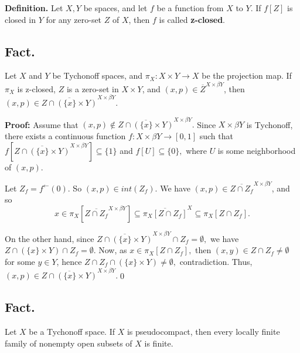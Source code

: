 \documentclass{article}
\begin{document}
		  \textbf{Definition.} Let $X,Y$ be spaces, and let $f$ be a function from $X$ to $Y$. If $f[Z]$ is closed in $Y$ for any zero-set $Z$ of $X$, then $f$ is called \textbf{z-closed}.

		  \vskip 30pt






		  \subsection{Fact.}  Let $X$ and $Y$ be Tychonoff spaces, and $\pi_X: X\times Y\rightarrow X$ be the projection map. If $\pi_X$ is z-closed, $Z$ is a zero-set in $X\times Y$, and $(x,p)\in \overline{Z}^{X\times \beta Y}$, then $(x,p)\in \overline{Z\cap \left(\{x\}\times Y\right)}^{X\times \beta Y}$.

		  \vskip 20pt

		  \textbf{Proof: }Assume that $(x,p)\notin \overline{Z\cap (\{x\}\times Y)}^{X\times \beta Y}.$ Since $X\times \beta Y$ is Tychonoff, there exists a continuous function $f: X\times \beta Y \rightarrow [0,1]$ such that $f\left[\overline{Z\cap (\{x\}\times Y)}^{X\times \beta Y}\right] \subseteq \{1\}$ and $f[U]\subseteq \{0\},$ where $U$ is some neighborhood of $(x,p).$ 

		  \vskip 15pt

		  Let $Z_f=f^{\leftarrow}(0).$ So $(x,p)\in int(Z_f)$. We have $(x,p)\in \overline{Z\cap Z_f}^{X\times \beta Y}$, and so
		  $$x\in \pi_X\left[\overline{Z\cap Z_f}^{X\times \beta Y}\right] \subseteq \overline{\pi_X\left[Z\cap Z_f\right]}^X \subseteq \pi_X\left[Z\cap Z_f\right].$$

		  \vskip 10pt

		  On the other hand, since $\overline{Z\cap(\{x\}\times Y)}^{X\times \beta Y} \cap Z_f = \emptyset, $ 
		  we have $Z\cap (\{x\}\times Y) \cap Z_f=\emptyset$. Now, as $x\in \pi_X\left[Z\cap Z_f\right],$ then $(x,y)\in Z\cap Z_f\neq \emptyset$ for some $y\in Y$, hence 
		  $Z\cap Z_f\cap (\{x\}\times Y) \neq \emptyset,$  contradiction. Thus, $(x,p)\in \overline{Z\cap (\{x\}\times Y)}^{X\times \beta Y}.$\qed








		  \vskip 40pt






		  \subsection{Fact.} Let $X$ be a Tychonoff space. If $X$ is pseudocompact, then every locally finite family of nonempty open subsets of $X$ is finite.
\end{document}
